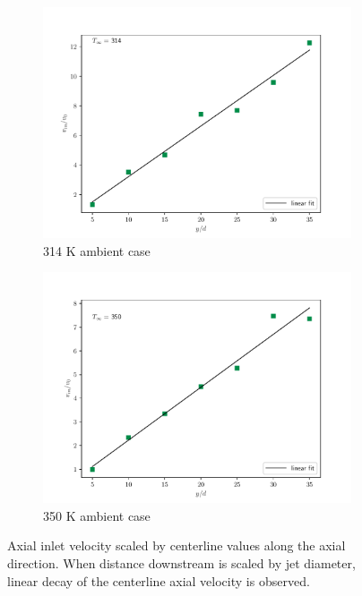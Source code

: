 \begin{figure}[H]
\begin{center}
\begin{subfigure}{0.45\textwidth}
	\includegraphics[scale=.45]{figures/Plots/radial/slices_5/314_ambient/uin_u0_vs_x_d.pdf}
	\caption{314 K ambient case} \label{noniso_uin_u0_x_c_1}
\end{subfigure}
\begin{subfigure}{0.45\textwidth}
	\includegraphics[scale=.45]{figures/Plots/radial/slices_5/350_ambient/uin_u0_vs_x_d.pdf}
	\caption{350 K ambient case} \label{noniso_uin_u0_x_d_2}
\end{subfigure}
\caption{Axial inlet velocity scaled by centerline values along the axial direction. When distance downstream is scaled by jet diameter, linear decay of the centerline axial velocity is observed.}
\label{noniso_uin_u0_x_d_features}
\end{center}
\end{figure}


